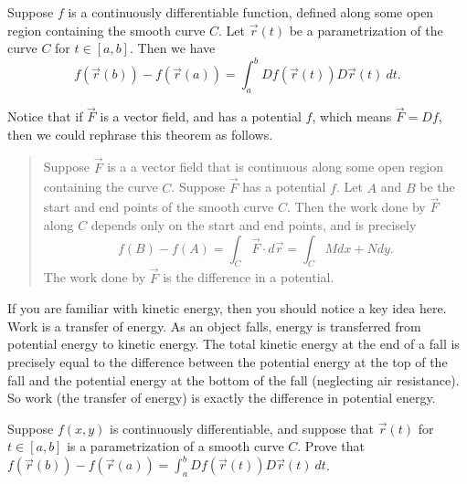 \begin{theorem}
%
 Suppose $f$ is a continuously differentiable function, defined along some open region containing the smooth curve $C$. Let $\vec r(t)$ be a parametrization of the curve $C$ for $t\in[a,b]$. Then we have
$$f(\vec r(b))-f(\vec r(a))=\int_a^b Df(\vec r(t))D\vec r(t)\ dt.$$
\end{theorem}
Notice that if $\vec F$ is a vector field, and has a potential $f$, which means $\vec F = Df$, then we could rephrase this theorem as follows. 
\begin{quote}
 Suppose $\vec F$ is a a vector field that is continuous along some open region containing the curve $C$. Suppose $\vec F$ has a potential $f$. Let $A$ and $B$ be the start and end points of the smooth curve $C$.  Then the work done by $\vec F$ along $C$ depends only on the start and end points, and is precisely
$$f(B)-f(A)=\int_C \vec F\cdot d\vec r = \int_C Mdx+Ndy.$$
 The work done by $\vec F$ is the difference in a potential.
\end{quote}
If you are familiar with kinetic energy, then you should notice a key idea here.  Work is a transfer of energy. As an object falls, energy is transferred from potential energy to kinetic energy.  The total kinetic energy at the end of a fall is precisely equal to the difference between the potential energy at the top of the fall and the potential energy at the bottom of the fall (neglecting air resistance). So work (the transfer of energy) is exactly the difference in potential energy.  

\begin{challenge}
Suppose $f(x,y)$ is continuously differentiable, and suppose that $\vec r(t)$ for $t\in[a,b]$ is a parametrization of a smooth curve $C$. Prove that $f(\vec r(b))-f(\vec r(a)) = \int_a^b Df(\vec r(t))D\vec r(t)\ dt$. 
\end{challenge}

